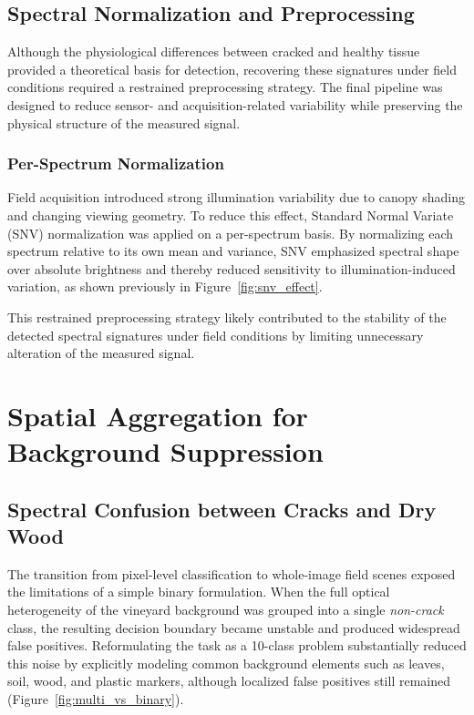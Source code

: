 \clearpage
\subsection{Spectral Normalization and Preprocessing}

\medskip
\noindent
Although the physiological differences between cracked and healthy tissue provided a theoretical basis for detection, recovering these signatures under field conditions required a restrained preprocessing strategy. The final pipeline was designed to reduce sensor- and acquisition-related variability while preserving the physical structure of the measured signal.

\subsubsection{Per-Spectrum Normalization}

\noindent
Field acquisition introduced strong illumination variability due to canopy shading and changing viewing geometry. To reduce this effect, Standard Normal Variate (SNV) normalization was applied on a per-spectrum basis. By normalizing each spectrum relative to its own mean and variance, SNV emphasized spectral shape over absolute brightness and thereby reduced sensitivity to illumination-induced variation, as shown previously in Figure~\ref{fig:snv_effect}.

\noindent
This restrained preprocessing strategy likely contributed to the stability of the detected spectral signatures under field conditions by limiting unnecessary alteration of the measured signal.

\section{Spatial Aggregation for Background Suppression}
\label{sec:spatial_aggregation}

\subsection{Spectral Confusion between Cracks and Dry Wood}
\noindent
The transition from pixel-level classification to whole-image field scenes exposed the limitations of a simple binary formulation. When the full optical heterogeneity of the vineyard background was grouped into a single \textit{non-crack} class, the resulting decision boundary became unstable and produced widespread false positives. Reformulating the task as a 10-class problem substantially reduced this noise by explicitly modeling common background elements such as leaves, soil, wood, and plastic markers, although localized false positives still remained (Figure~\ref{fig:multi_vs_binary}).

